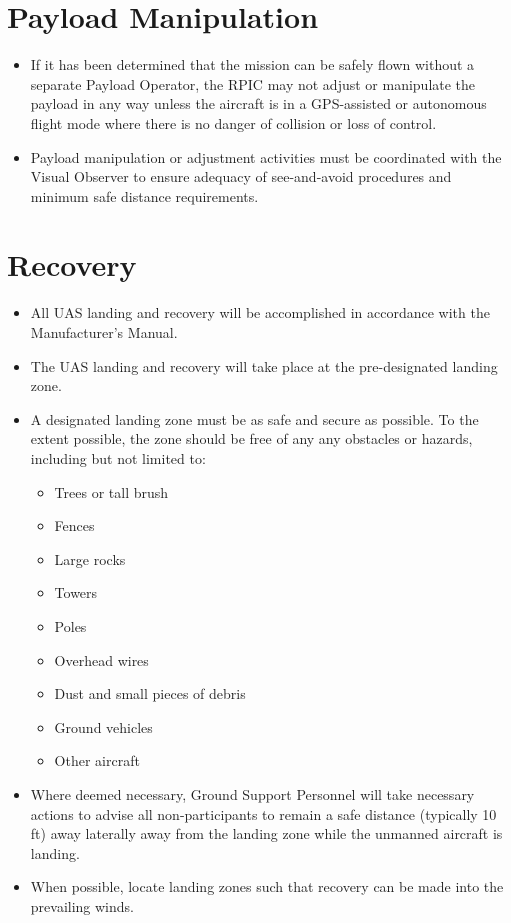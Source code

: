 \documentclass[
]{book}
\providecommand{\tightlist}{%
  \setlength{\itemsep}{0pt}\setlength{\parskip}{0pt}}
\begin{document}
\section{Payload Manipulation}\label{payload-manipulation}

\begin{itemize}
\tightlist
\item
  If it has been determined that the mission can be safely flown without a separate Payload Operator, the RPIC may not adjust or manipulate the payload in any way unless the aircraft is in a GPS-assisted or autonomous flight mode where there is no danger of collision or loss of control.
\item
  Payload manipulation or adjustment activities must be coordinated with the Visual Observer to ensure adequacy of see-and-avoid procedures and minimum safe distance requirements.
\end{itemize}

\section{Recovery}\label{recovery}

\begin{itemize}
\item
  All UAS landing and recovery will be accomplished in accordance with the Manufacturer's Manual.
\item
  The UAS landing and recovery will take place at the pre-designated landing zone.
\item
  A designated landing zone must be as safe and secure as possible. To the extent possible, the zone should be free of any any obstacles or hazards, including but not limited to:

  \begin{itemize}
  \tightlist
  \item
    Trees or tall brush
  \item
    Fences
  \item
    Large rocks
  \item
    Towers
  \item
    Poles
  \item
    Overhead wires
  \item
    Dust and small pieces of debris
  \item
    Ground vehicles
  \item
    Other aircraft
  \end{itemize}
\item
  Where deemed necessary, Ground Support Personnel will take necessary actions to advise all non-participants to remain a safe distance (typically 10 ft) away laterally away from the landing zone while the unmanned aircraft is landing.
\item
  When possible, locate landing zones such that recovery can be made into the prevailing winds.
\end{itemize}
\end{document}
